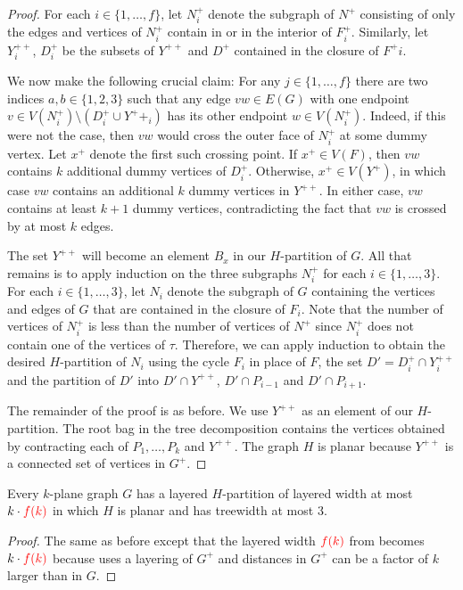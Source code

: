 \documentclass{patmorin}
\newcommand{\fk}{{\color{red}f(k)}}
\begin{document}
\begin{proof}
  For each $i\in\{1,\ldots,f\}$, let $N^+_i$ denote the subgraph of $N^+$ consisting of only the edges and vertices of $N^+_i$ contain in or in the interior of $F_i^+$.  Similarly, let $Y^{++}_i$, $D^+_i$ be the subsets of $Y^{++}$ and $D^+$ contained in the closure of $F^+i$.
  
  We now make the following crucial claim:
  For any $j\in\{1,\ldots,f\}$ there are two indices $a,b\in\{1,2,3\}$ such that any edge $vw\in E(G)$ with one endpoint $v\in V(N^+_i)\setminus(D^+_i\cup Y^++_i)$ has its other endpoint $w\in V(N^+_i)$.
  Indeed, if this were not the case, then $vw$ would cross the outer face of $N^+_i$ at some dummy vertex.  Let $x^+$ denote the first such crossing point.  If $x^+\in V(F)$, then $vw$ contains $k$ additional dummy vertices of $D^+_i$. Otherwise, $x^+\in V(Y^+)$, in which case $vw$ contains an additional $k$ dummy vertices in $Y^{++}$.  In either case, $vw$ contains at least $k+1$ dummy vertices, contradicting the fact that $vw$ is crossed by at most $k$ edges.
  
  The set $Y^{++}$ will become an element $B_x$ in our $H$-partition of $G$.
  All that remains is to apply induction on the three subgraphs $N^+_i$ for each $i\in\{1,\ldots,3\}$.  For each $i\in\{1,\ldots,3\}$,
  let $N_i$ denote the subgraph of $G$ containing the vertices and edges of $G$ that are contained in the closure of $F_i$.  Note that the number of vertices of $N_i^+$ is less than the number of vertices of $N^+$ since $N_i^+$ does not contain one of the vertices of $\tau$.  Therefore, we can apply induction to obtain the desired $H$-partition of $N_i$ using the cycle $F_i$ in place of $F$, the set $D' = D^+_i\cap Y^{++}_i$ and the partition of $D'$ into $D'\cap Y^{++}$, $D'\cap P_{i-1}$ and $D'\cap P_{i+1}$.
  
  The remainder of the proof is as before. We use $Y^{++}$ as an element of our $H$-partition. The root bag in the tree decomposition contains the vertices obtained by contracting each of $P_1,\ldots,P_k$ and $Y^{++}$.  The graph $H$ is planar because $Y^{++}$ is a connected set of vertices in $G^+$. 
\end{proof}


\begin{thm}
  Every $k$-plane graph $G$ has a layered $H$-partition of layered width at most $k\cdot\fk$ in which $H$ is planar and has treewidth at most 3.
\end{thm}

\begin{proof}
  The same as before except that the layered width $\fk$ from  becomes $k\cdot\fk$ because  uses a layering of $G^+$ and distances in $G^+$ can be a factor of $k$ larger than in $G$.
\end{proof}
\end{document}
